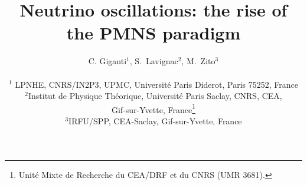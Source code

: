 \documentclass[twoside,12pt]{article}
\begin{document}



\title{Neutrino oscillations: the rise of the PMNS paradigm}

\author{C. Giganti$^1$, S.\ Lavignac$^2$, M.\ Zito$^3$ \\
\\
$^1$ LPNHE, CNRS/IN2P3, UPMC, Universit\'{e} Paris Diderot, Paris 75252, France\\
$^2$Institut de Physique Th\'{e}orique,
Universit\'e Paris Saclay, CNRS, CEA,\\
Gif-sur-Yvette, France\footnote{Unit\'e Mixte de Recherche
du CEA/DRF et du CNRS (UMR 3681).}\\
$^3$IRFU/SPP, CEA-Saclay, Gif-sur-Yvette, France}
\end{document}
